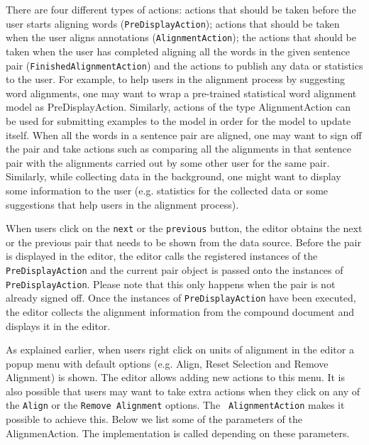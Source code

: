 There are four different types of actions: actions that should be taken before
the user starts aligning words ({\tt PreDisplayAction}); actions that should be 
taken when the user aligns annotations ({\tt AlignmentAction}); the actions
that should be taken when the user has completed aligning all the words in the 
given sentence pair ({\tt FinishedAlignmentAction}) and the actions to publish
any data or statistics to the user. For example, to help users in the alignment 
process by suggesting word alignments, one may want to wrap a pre-trained 
statistical word alignment model as PreDisplayAction. Similarly, actions of the
type AlignmentAction can be used for submitting examples to the model in order 
for the model to update itself. When all the words in a sentence pair are 
aligned, one may want to sign off the pair and take actions such as comparing 
all the alignments in that sentence pair with the alignments carried out by some
other user for the same pair. Similarly, while collecting data in the background,
one might want to display some information to the user (e.g. statistics for the
collected data or some suggestions that help users in the alignment process).

When users click on the {\tt next} or the {\tt previous} button, the editor 
obtains the next or the previous pair that needs to be shown from the data 
source.  Before the pair is displayed in the editor, the editor calls the 
registered instances of the {\tt PreDisplayAction} and the current pair object
is passed onto the instances of {\tt PreDisplayAction}. Please note that this
only happens when the pair is not already signed off. Once the instances of 
{\tt PreDisplayAction} have been executed, the editor collects the alignment
information from the compound document and displays it in the editor.

As explained earlier, when users right click on units of alignment in the editor
a popup menu with default options (e.g. Align, Reset Selection and Remove
Alignment) is shown.  The editor allows adding new actions to this menu.  It is 
also possible that users may want to take extra actions when they click on any 
of the {\tt Align} or the {\tt Remove Alignment} options.  The {\tt 
AlignmentAction} makes it possible to achieve this.  Below we list some of the 
parameters of the AlignmenAction. The implementation is called depending on 
these parameters.

